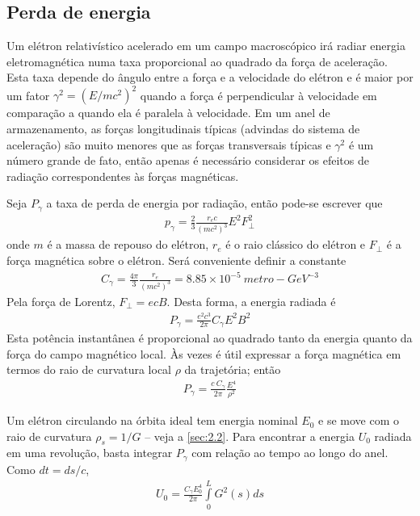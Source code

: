 \subsection{Perda de energia}\label{sec:4.1}
Um elétron relativístico acelerado em um campo macroscópico irá radiar energia eletromagnética numa taxa proporcional ao quadrado da força de aceleração. Esta taxa depende do ângulo entre a força e a velocidade do elétron e é maior por um fator $\gamma^2 = (E/mc^2)^2$ quando a força é perpendicular à velocidade em comparação a quando ela é paralela à velocidade. Em um anel de armazenamento, as forças longitudinais típicas (advindas do sistema de aceleração) são muito menores que as forças transversais típicas e $\gamma^2$ é um número grande de fato, então apenas é necessário considerar os efeitos de radiação correspondentes às forças magnéticas.

Seja $P_\gamma$ a taxa de perda de energia por radiação, então pode-se escrever que
\begin{align}
	p_\gamma = \frac{2}{3}\frac{r_e c}{(mc^2)^3} E^2 F_\perp^2
\end{align}
onde $m$ é a massa de repouso do elétron, $r_e$ é o raio clássico do elétron e $F_\perp$ é a força magnética sobre o elétron. Será conveniente definir a constante
\begin{align}
	C_\gamma = \frac{4\pi}{3}\frac{r_e}{(mc^2)^3} = 8.85 \times 10^{-5}\ metro-GeV^{-3}
\end{align}
Pela força de Lorentz, $F_\perp = ecB$. Desta forma, a energia radiada é
\begin{align}
	P_\gamma = \frac{e^2c^3}{2\pi}C_\gamma E^2 B^2\label{eq:4.3}
\end{align}
Esta potência instantânea é proporcional ao quadrado tanto da energia quanto da força do campo magnético local. Às vezes é útil expressar  a força magnética em termos do raio de curvatura local $\rho$ da trajetória; então
\begin{align}
	P_\gamma = \frac{c\ C_\gamma}{2\pi}\frac{E^4}{\rho^2}
\end{align}

Um elétron circulando na órbita ideal tem energia nominal $E_0$ e se move com o raio de curvatura $\rho_s = 1/G$ -- veja a \autoref{sec:2.2}. Para encontrar a energia $U_0$ radiada em uma revolução, basta integrar $P_\gamma$ com relação ao tempo  ao longo do anel. Como $dt = ds/c$,
\begin{align}
	U_0 = \frac{C_\gamma E_0^4}{2\pi}\int\limits_{0}^{L}G^2(s)ds\label{eq:4.5}
\end{align}

